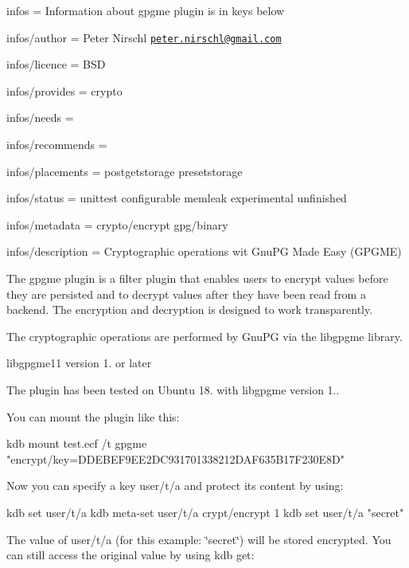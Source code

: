 
\begin{DoxyItemize}
\item infos = Information about gpgme plugin is in keys below
\item infos/author = Peter Nirschl \href{mailto:peter.nirschl@gmail.com}{\tt peter.\+nirschl@gmail.\+com}
\item infos/licence = B\+SD
\item infos/provides = crypto
\item infos/needs =
\item infos/recommends =
\item infos/placements = postgetstorage presetstorage
\item infos/status = unittest configurable memleak experimental unfinished
\item infos/metadata = crypto/encrypt gpg/binary
\item infos/description = Cryptographic operations wit Gnu\+PG Made Easy (G\+P\+G\+ME)
\end{DoxyItemize}

The {\ttfamily gpgme} plugin is a filter plugin that enables users to encrypt values before they are persisted and to decrypt values after they have been read from a backend. The encryption and decryption is designed to work transparently.

The cryptographic operations are performed by Gnu\+PG via the {\ttfamily libgpgme} library.


\begin{DoxyItemize}
\item {\ttfamily libgpgme11} version 1. or later
\end{DoxyItemize}

The plugin has been tested on Ubuntu 18. with {\ttfamily libgpgme} version 1..

You can mount the plugin like this\+:


\begin{DoxyCode}
kdb mount test.ecf /t gpgme "encrypt/key=DDEBEF9EE2DC931701338212DAF635B17F230E8D"
\end{DoxyCode}


Now you can specify a key {\ttfamily user/t/a} and protect its content by using\+:


\begin{DoxyCode}
kdb set user/t/a
kdb meta-set user/t/a crypt/encrypt 1
kdb set user/t/a "secret"
\end{DoxyCode}


The value of {\ttfamily user/t/a} (for this example\+: \char`\"{}secret\char`\"{}) will be stored encrypted. You can still access the original value by using {\ttfamily kdb get}\+:


